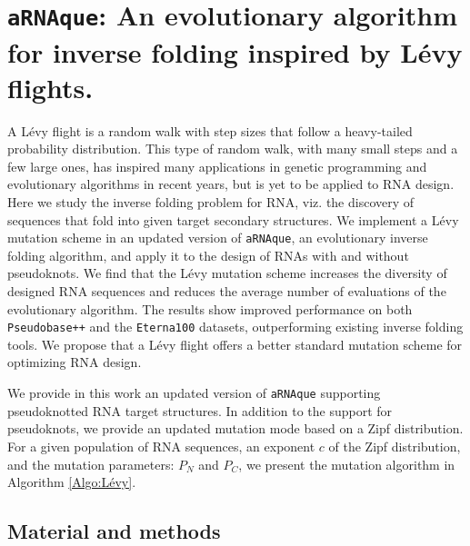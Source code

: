 \chapter{\texttt{aRNAque}: An evolutionary algorithm for inverse folding inspired by Lévy flights.}\label{ch:arnaque}

	A Lévy flight is a random walk with step sizes that follow a heavy-tailed probability distribution. This type of random walk, with many small steps and a few large ones, has inspired many applications in genetic programming and evolutionary algorithms in recent years, but is yet to be applied to RNA design. Here we study the inverse folding problem for RNA, viz. the discovery of sequences that fold into given target secondary structures. We implement a Lévy mutation scheme in an updated version of \texttt{aRNAque}, an evolutionary inverse folding algorithm, and apply it to the design of RNAs with and without pseudoknots. We find that the Lévy mutation scheme increases the diversity of designed RNA sequences and reduces the average number of evaluations of the evolutionary algorithm. The results show improved performance on both \texttt{Pseudobase++} and the \texttt{Eterna100} datasets, outperforming existing inverse folding tools. We propose that a Lévy flight offers a better standard mutation scheme for optimizing RNA design.
	
	We provide in this work an updated version of \texttt{aRNAque} supporting pseudoknotted RNA target structures. In addition to the  support for pseudoknots, we provide an updated mutation mode based on a Zipf distribution. For a given population of RNA sequences, an exponent $c$ of the Zipf distribution, and the mutation parameters: $P_N$ and $P_C$, we present the mutation algorithm in Algorithm \ref{Algo:Lévy}.
	
\section{Material and methods}

